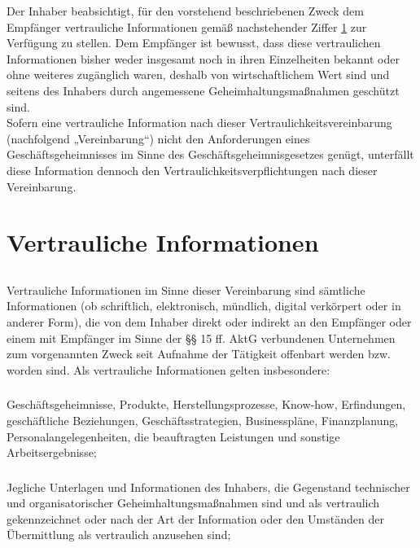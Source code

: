 \documentclass[10pt]{article}
\begin{document}
Der Inhaber beabsichtigt, für den vorstehend beschriebenen Zweck dem Empfänger vertrauliche Informationen gemäß nachstehender Ziffer \ref{ziff:1} zur Verfügung zu stellen. Dem Empfänger ist bewusst, dass diese vertraulichen Informationen bisher weder insgesamt noch in ihren Einzelheiten bekannt oder ohne weiteres zugänglich waren, deshalb von wirtschaftlichem Wert sind und seitens des Inhabers durch angemessene Geheimhaltungsmaßnahmen geschützt sind.\\

Sofern eine vertrauliche Information nach dieser Vertraulichkeitsvereinbarung (nachfolgend „Vereinbarung“) nicht den Anforderungen eines Geschäftsgeheimnisses im Sinne des Geschäftsgeheimnisgesetzes genügt, unterfällt diese Information dennoch den Vertraulichkeitsverpflichtungen nach dieser Vereinbarung.


\section{Vertrauliche Informationen} \label{ziff:1}
\subsection{} Vertrauliche Informationen im Sinne dieser Vereinbarung sind sämtliche Informationen (ob schriftlich, elektronisch, mündlich, digital verkörpert oder in anderer Form), die von dem Inhaber direkt oder indirekt an den Empfänger oder einem mit Empfänger im Sinne der §§ 15 ff. AktG verbundenen Unternehmen zum vorgenannten Zweck seit Aufnahme der Tätigkeit offenbart werden bzw. worden sind. Als vertrauliche Informationen gelten insbesondere:

\subsubsection{} Geschäftsgeheimnisse, Produkte, Herstellungsprozesse, Know-how, Erfindungen, geschäftliche Beziehungen, Geschäftsstrategien, Businesspläne, Finanzplanung, Personalangelegenheiten, die beauftragten Leistungen und sonstige Arbeitsergebnisse;

\subsubsection{} \label{ziff:1.1.2} Jegliche Unterlagen und Informationen des Inhabers, die Gegenstand technischer und organisatorischer Geheimhaltungsmaßnahmen sind und als vertraulich gekennzeichnet oder nach der Art der Information oder den Umständen der Übermittlung als vertraulich anzusehen sind;
\end{document}
